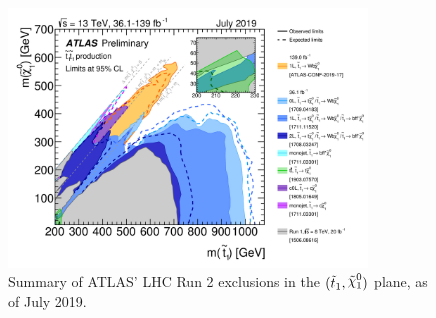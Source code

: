 \begin{figure}[!htb]
    \begin{center}
        \includegraphics[width=0.85\textwidth]{figures/conclusion/ATLAS_SUSY_Stop_tLSP}
        \caption{
            Summary of ATLAS' LHC Run 2 exclusions in the $(\stopone, \ninoone)$ plane,
            as of July 2019.
        }
        \label{fig:run2_stop_summary}
    \end{center}
\end{figure}

%
%

